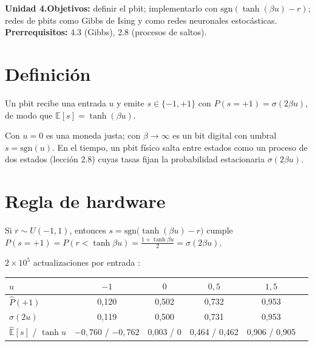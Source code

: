 \documentclass[11pt,a4paper]{article}
\begin{document}

\noindent\textbf{Unidad 4.}\quad\textbf{Objetivos:} definir el pbit; implementarlo con $\mathrm{sgn}(\tanh(\beta u)-r)$; redes de pbits como Gibbs de Ising y como
redes neuronales estocásticas.
\textbf{Prerrequisitos:} 4.3 (Gibbs), 2.8 (procesos de saltos).

\section{Definición}
\begin{definicion}[ (pbit)]
Un pbit recibe una entrada $u$ y emite $s\in\{-1,+1\}$ con $P(s=+1)=\sigma(2\beta u)$, de modo que $\mathbb E[s]=\tanh(\beta u)$.
\end{definicion}
Con $u=0$ es una moneda justa; con $\beta\to\infty$ es un bit digital con umbral $s=\mathrm{sgn}(u)$. En el tiempo, un pbit físico salta entre
estados como un proceso de dos estados (lección 2.8) cuyas tasas fijan la probabilidad estacionaria $\sigma(2\beta u)$.

\section{Regla de hardware}
\begin{resultado}
Si $r\sim U(-1,1)$, entonces $s=\mathrm{sgn}\big(\tanh(\beta u)-r\big)$ cumple $P(s=+1)=P(r<\tanh\beta u)=\frac{1+\tanh\beta u}{2}=\sigma(2\beta u)$.
\end{resultado}
\begin{ejemplo}
$2\times10^5$ actualizaciones por entrada \evS:
\begin{center}\begin{tabular}{lccccc}\toprule
$u$ & $-1$ & $0$ & $0{,}5$ & $1{,}5$\\\midrule
$\hat P(+1)$ & 0,120 & 0,502 & 0,732 & 0,953\\
$\sigma(2u)$ & 0,119 & 0,500 & 0,731 & 0,953\\
$\hat{\mathbb E}[s]$ / $\tanh u$ & $-0{,}760$ / $-0{,}762$ & 0,003 / 0 & 0,464 / 0,462 & 0,906 / 0,905\\\bottomrule\end{tabular}\end{center}
\end{ejemplo}
\end{document}
